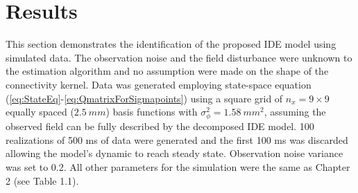 \documentclass[]{article}
\begin{document}
\section{Results}
This section demonstrates the identification of the proposed IDE model using simulated data. The observation noise and the field disturbance were unknown to the estimation algorithm and no assumption were made on the shape of the connectivity kernel. Data was generated employing state-space equation (\ref{eq:StateEq}-\ref{eq:QmatrixForSigmapoints}) using a square grid of $n_x= 9 \times 9$ equally spaced ($2.5~mm$) basis functions with $\sigma_{\phi}^2=1.58~mm^2$, assuming the observed field can be fully described by the decomposed IDE model. 100 realizations of 500 ms of data were generated and the first 100 ms was discarded allowing the model's dynamic to reach steady state. Observation noise variance was set to 0.2. All other parameters for the simulation were the same as Chapter 2 (see Table 1.1).
\end{document}
